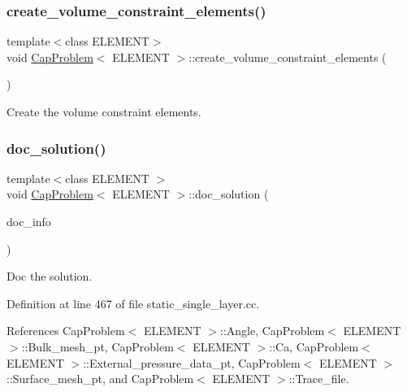 \subsubsection{\texorpdfstring{create\+\_\+volume\+\_\+constraint\+\_\+elements()}{create\_volume\_constraint\_elements()}\hspace{0.1cm}{\footnotesize\ttfamily [2/2]}}
{\footnotesize\ttfamily template$<$class E\+L\+E\+M\+E\+NT$>$ \\
void \hyperlink{classCapProblem}{Cap\+Problem}$<$ E\+L\+E\+M\+E\+NT $>$\+::create\+\_\+volume\+\_\+constraint\+\_\+elements (\begin{DoxyParamCaption}{ }\end{DoxyParamCaption})}



Create the volume constraint elements. 

\mbox{\label{classCapProblem_a8549ca722d2d151ebf3ef7b35b925fbb}} 
\subsubsection{\texorpdfstring{doc\+\_\+solution()}{doc\_solution()}\hspace{0.1cm}{\footnotesize\ttfamily [1/2]}}
{\footnotesize\ttfamily template$<$class E\+L\+E\+M\+E\+NT $>$ \\
void \hyperlink{classCapProblem}{Cap\+Problem}$<$ E\+L\+E\+M\+E\+NT $>$\+::doc\+\_\+solution (\begin{DoxyParamCaption}\item[{Doc\+Info \&}]{doc\+\_\+info }\end{DoxyParamCaption})}



Doc the solution. 



Definition at line 467 of file static\+\_\+single\+\_\+layer.\+cc.



References Cap\+Problem$<$ E\+L\+E\+M\+E\+N\+T $>$\+::\+Angle, Cap\+Problem$<$ E\+L\+E\+M\+E\+N\+T $>$\+::\+Bulk\+\_\+mesh\+\_\+pt, Cap\+Problem$<$ E\+L\+E\+M\+E\+N\+T $>$\+::\+Ca, Cap\+Problem$<$ E\+L\+E\+M\+E\+N\+T $>$\+::\+External\+\_\+pressure\+\_\+data\+\_\+pt, Cap\+Problem$<$ E\+L\+E\+M\+E\+N\+T $>$\+::\+Surface\+\_\+mesh\+\_\+pt, and Cap\+Problem$<$ E\+L\+E\+M\+E\+N\+T $>$\+::\+Trace\+\_\+file.



